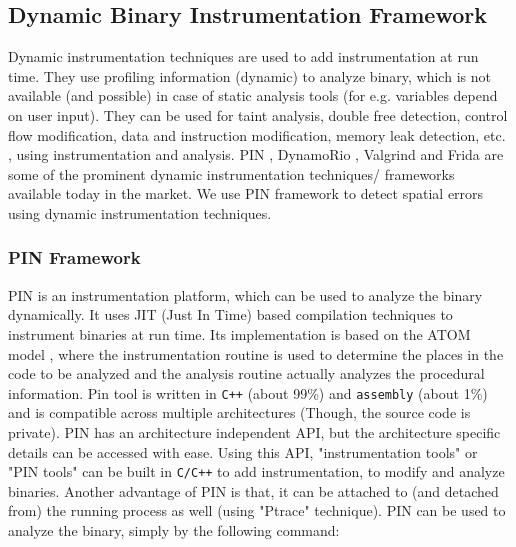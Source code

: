 \subsection{Dynamic Binary Instrumentation Framework}

Dynamic instrumentation techniques are used to add instrumentation at run time. They use profiling information (dynamic) to analyze binary, which is not available (and possible) in case of static analysis tools (for e.g. variables depend on user input). They can be used for taint analysis, double free detection, control flow modification, data and instruction modification, memory leak detection, etc. \citep{dynamicinstrumentationusage}, using instrumentation and analysis. PIN \citep{luk2005pin}, DynamoRio \citep{bruening2003infrastructure}, Valgrind \citep{nethercote2007valgrind} and Frida \citep{fridaframework} are some of the prominent dynamic instrumentation techniques/ frameworks available today in the market. We use PIN framework to detect spatial errors using dynamic instrumentation techniques.

\subsubsection{PIN Framework}
PIN \citep{luk2005pin} is an instrumentation platform, which can be used to analyze the binary dynamically. It uses JIT (Just In Time) based compilation techniques to instrument binaries at run time. Its implementation is based on the ATOM model \citep{srivastava1994atom}, where the instrumentation routine is used to determine the places in the code to be analyzed and the analysis routine actually analyzes the procedural information. Pin tool is written in \texttt{C++} (about 99\%) and \texttt{assembly} (about 1\%) and is compatible across multiple architectures (Though, the source code is private). PIN has an architecture independent API, but the architecture specific details can be accessed with ease. Using this API, "instrumentation tools" or "PIN tools" can be built in \texttt{C/C++} to add instrumentation, to modify and analyze binaries. Another advantage of PIN is that, it can be attached to (and detached from) the running process as well (using "Ptrace" technique). PIN can be used to analyze the binary, simply by the following command:

